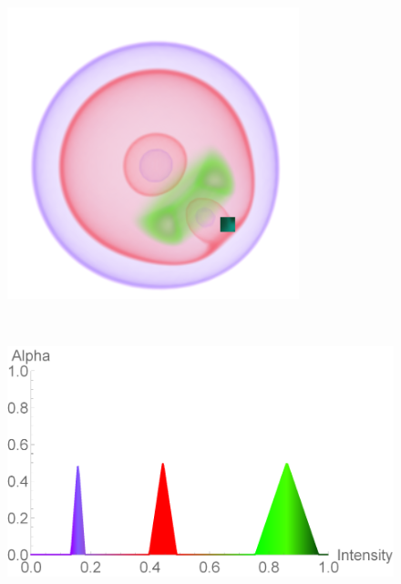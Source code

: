 \documentclass[twoside,twocolumn,10pt]{article}
\begin{document}
\begin{figure}[t]
	\centering
	\begin{minipage}{.2\textwidth}
		\centering
		\includegraphics[width=1\linewidth]{nucleon_crop}\\
		\label{fig:nucleon}
	\end{minipage}~
	\begin{minipage}{.245\textwidth}
		\centering
		\includegraphics[width=1\linewidth]{tf_nucleon}\\
		\label{fig:tf_nucleon}
	\end{minipage}

\end{figure}
\end{document}

